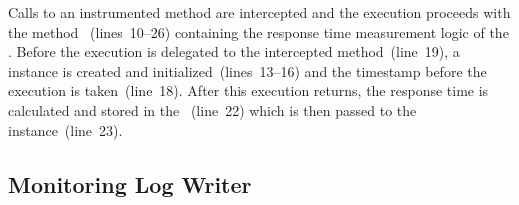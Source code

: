 

\noindent Calls to an instrumented method are intercepted and the execution %
proceeds with the method ~(lines~10--26) containing the %
response time measurement logic of the \MonitoringProbe{}. %
Before the execution is delegated to the intercepted method~(line~19), %
a \MonitoringRecord{} instance is created and initialized~(lines~13--16) %
and the timestamp before the execution is taken~(line~18). %
After this execution returns, the response time is calculated and stored in %
the \MonitoringRecord{}~(line~22) which is then passed to the \TpmonController{} %
instance~(line~23).

\subsection{Monitoring Log Writer}\label{sec:monitoringlogwriter}

